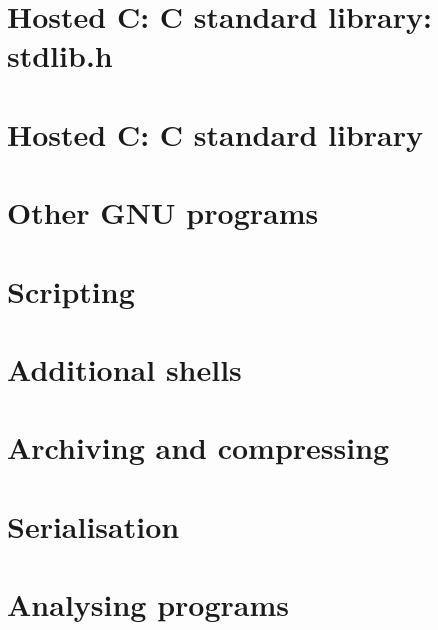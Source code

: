 \documentclass[oneside]{book}
\begin{document}
\part{Hosted C: C standard library: stdlib.h}






\part{Hosted C: C standard library}













\part{Other GNU programs}







\part{Scripting}



\part{Additional shells}





\part{Archiving and compressing}




\part{Serialisation}






\part{Analysing programs}


\end{document}
